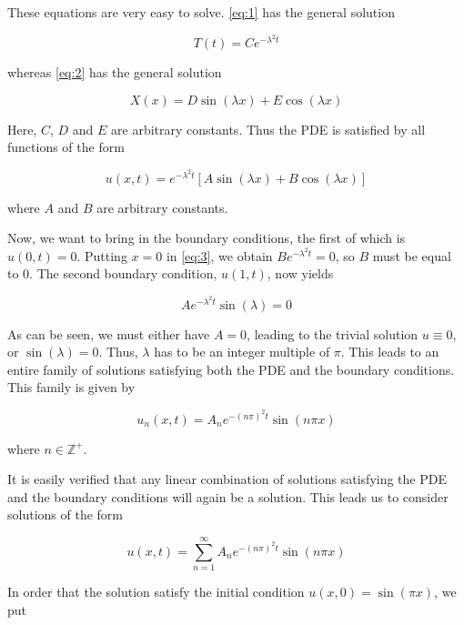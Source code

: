 \documentclass{article}
\begin{document}
These equations are very easy to solve. \eqref{eq:1} has the general solution

\begin{equation}
    T(t) = C e^{-\lambda^2 t}
\end{equation}

whereas \eqref{eq:2} has the general solution

\begin{equation}
    X(x) = D \sin(\lambda x) + E \cos(\lambda x)
\end{equation}

Here, $C$, $D$ and $E$ are arbitrary constants. Thus the PDE is satisfied by all functions of the form

\begin{equation}
    u(x, t) = e^{-\lambda^2 t}[A \sin(\lambda x) + B \cos(\lambda x)]\label{eq:3}
\end{equation}

where $A$ and $B$ are arbitrary constants.

Now, we want to bring in the boundary conditions, the first of which is $u(0, t) = 0$. Putting $x=0$ in \eqref{eq:3}, we obtain $B e^{-\lambda^2 t} = 0$, so $B$ must be equal to 0. The second boundary condition, $u(1, t)$, now yields

\begin{equation}
    A e^{-\lambda^2 t} \sin(\lambda) = 0
\end{equation}

As can be seen, we must either have $A=0$, leading to the trivial solution $u\equiv 0$, or $\sin(\lambda) = 0$. Thus, $\lambda$ has to be an integer multiple of $\pi$. This leads to an entire family of solutions satisfying both the PDE and the boundary conditions. This family is given by

\begin{equation}
    u_n(x, t) = A_n e^{-(n \pi)^2 t} \sin(n \pi x)
\end{equation}

where $n \in \mathbb{Z}^{+}$.

It is easily verified that any linear combination of solutions satisfying the PDE and the boundary conditions will again be a solution. This leads us to consider solutions of the form

\begin{equation}
    u(x, t) = \sum_{n=1}^{\infty}{A_n e^{-(n \pi)^2 t} \sin(n \pi x)}
\end{equation}

In order that the solution satisfy the initial condition $u(x, 0) = \sin(\pi x)$, we put
\end{document}
